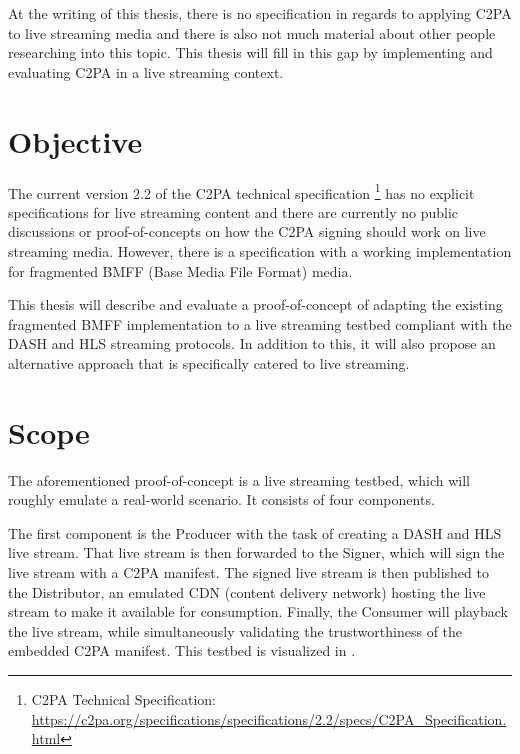 At the writing of this thesis, there is no specification in regards to applying C2PA to live streaming media and there is also not much material about other people researching into this topic. This thesis will fill in this gap by implementing and evaluating C2PA in a live streaming context.

\section{Objective\label{sec:objective}}

The current version 2.2 of the C2PA technical specification \footnote{C2PA Technical Specification: \url{https://c2pa.org/specifications/specifications/2.2/specs/C2PA_Specification.html}} has no explicit specifications for live streaming content and there are currently no public discussions or proof-of-concepts on how the C2PA signing should work on live streaming media. However, there is a specification with a working implementation for fragmented BMFF (Base Media File Format) media.

This thesis will describe and evaluate a proof-of-concept of adapting the existing fragmented BMFF implementation to a live streaming testbed compliant with the DASH and HLS streaming protocols. In addition to this, it will also propose an alternative approach that is specifically catered to live streaming.

\section{Scope\label{sec:scope}}

The aforementioned proof-of-concept is a live streaming testbed, which will roughly emulate a real-world scenario. It consists of four components.

The first component is the Producer with the task of creating a DASH and HLS live stream. That live stream is then forwarded to the Signer, which will sign the live stream with a C2PA manifest. The signed live stream is then published to the Distributor, an emulated CDN (content delivery network) hosting the live stream to make it available for consumption. Finally, the Consumer will playback the live stream, while simultaneously validating the trustworthiness of the embedded C2PA manifest. This testbed is visualized in .

